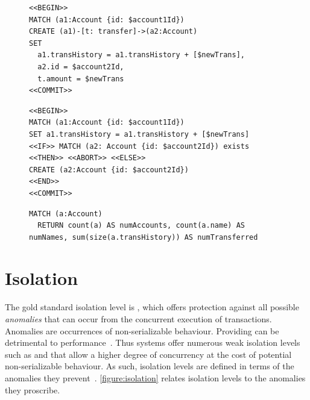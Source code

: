 \begin{figure}[htb]
\centering
\begin{minipage}{0.45\linewidth}
\begin{lstlisting}[language=cypher,label=fig:ac,caption=\tx{Atomicity-C Tx.}]
<<BEGIN>>
MATCH (a1:Account {id: $account1Id})
CREATE (a1)-[t: transfer]->(a2:Account)
SET
  a1.transHistory = a1.transHistory + [$newTrans],
  a2.id = $account2Id,
  t.amount = $newTrans
<<COMMIT>>
\end{lstlisting}
\end{minipage}
\quad
\begin{minipage}{0.52\linewidth}
\begin{lstlisting}[language=cypher,label=fig:arb,caption=\tx{Atomicity-RB Tx.}]
<<BEGIN>>
MATCH (a1:Account {id: $account1Id})
SET a1.transHistory = a1.transHistory + [$newTrans]
<<IF>> MATCH (a2: Account {id: $account2Id}) exists
<<THEN>> <<ABORT>> <<ELSE>>
CREATE (a2:Account {id: $account2Id})
<<END>>
<<COMMIT>>
\end{lstlisting}
\end{minipage}
\end{figure}


\begin{figure}[htb]
\centering
\begin{lstlisting}[language=cypher,label=fig:acheck,caption=\tx{Atomicity-C/Atomicity-RB:} counting entities in the graph.]
  MATCH (a:Account)
  RETURN count(a) AS numAccounts, count(a.name) AS numNames, sum(size(a.transHistory)) AS numTransferred
\end{lstlisting}
\end{figure}

\section{Isolation}
\label{sec:isolation}

The gold standard isolation level is , which offers 
protection against all possible \emph{anomalies} that can occur from the 
concurrent execution of transactions. Anomalies are occurrences of 
non-serializable behaviour. Providing  can be detrimental
to performance~\cite{DBLP:conf/ds/GrayLPT76}. Thus systems offer numerous weak
isolation levels such as  and  
that allow a higher degree of concurrency at the cost of potential 
non-serializable behaviour. As such, isolation levels are defined in terms of 
the anomalies they prevent~\cite{DBLP:conf/ds/GrayLPT76,DBLP:journals/pvldb/BailisDFGHS13}.
\autoref{figure:isolation} relates isolation levels to the anomalies they proscribe.

